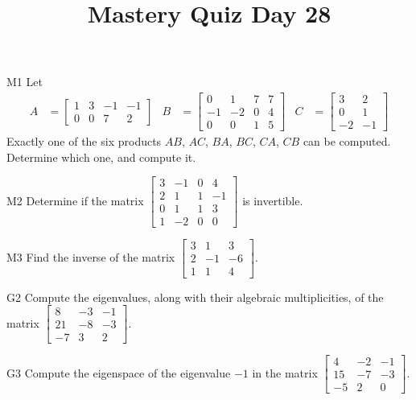 \documentclass{sbgLAquiz}
\title{Mastery Quiz Day 28 }
\begin{document}
\begin{problem}{M1}
Let
\begin{align*}
A &= \begin{bmatrix} 1 & 3 & -1 & -1 \\ 0 & 0 & 7 & 2 \end{bmatrix} & B &= \begin{bmatrix} 0 & 1 & 7 & 7 \\ -1 & -2 & 0 & 4 \\ 0 & 0 & 1 & 5 \end{bmatrix} & C&=\begin{bmatrix} 3 & 2 \\ 0 & 1 \\ -2 & -1 \end{bmatrix}
\end{align*}
Exactly one of the six products $AB$, $AC$, $BA$, $BC$, $CA$, $CB$ can be computed.  Determine which one, and compute it.
\end{problem}

\begin{problem}{M2}
Determine if the matrix $\begin{bmatrix} 3 & -1 & 0 & 4 \\ 2 & 1 & 1 & -1 \\ 0 & 1 & 1 & 3 \\ 1 & -2 & 0 & 0 \end{bmatrix}$ is invertible.
\end{problem}
\newpage

\begin{problem}{M3}
  Find the inverse of the matrix
  \(\begin{bmatrix}
    3 & 1 & 3  \\
    2 & -1 & -6  \\
    1 & 1 & 4
  \end{bmatrix}\).
\end{problem}

\begin{problem}{G2}
Compute the eigenvalues, along with their algebraic multiplicities, of the matrix $ \begin{bmatrix} 8 & -3 & -1 \\ 21 & -8 & -3 \\ -7 & 3 & 2\end{bmatrix}$.
\end{problem}
\newpage

\begin{problem}{G3}
Compute the eigenspace of the eigenvalue $-1$ in the matrix $\begin{bmatrix} 4 & -2 & -1 \\ 15 & -7 & -3 \\ -5 & 2 & 0 \end{bmatrix}$.
\end{problem}
\end{document}
